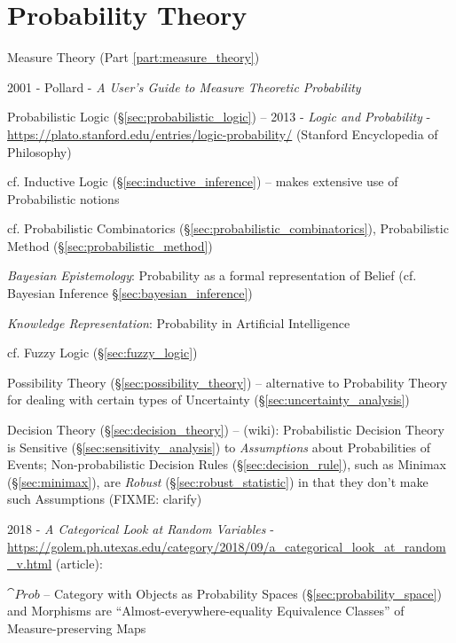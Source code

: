 \part{Probability Theory}\label{part:probability_theory}

\fist Measure Theory (Part \ref{part:measure_theory})

2001 - Pollard - \emph{A User's Guide to Measure Theoretic Probability}

\fist Probabilistic Logic (\S\ref{sec:probabilistic_logic}) --
2013 - \emph{Logic and Probability} -
\url{https://plato.stanford.edu/entries/logic-probability/} (Stanford
Encyclopedia of Philosophy)

\fist cf. Inductive Logic (\S\ref{sec:inductive_inference}) -- makes extensive
use of Probabilistic notions

cf. Probabilistic Combinatorics (\S\ref{sec:probabilistic_combinatorics}),
Probabilistic Method (\S\ref{sec:probabilistic_method})

\emph{Bayesian Epistemology}: Probability as a formal representation of Belief
(cf. Bayesian Inference \S\ref{sec:bayesian_inference})

\emph{Knowledge Representation}: Probability in Artificial Intelligence

\fist cf. Fuzzy Logic (\S\ref{sec:fuzzy_logic})

\fist Possibility Theory (\S\ref{sec:possibility_theory}) -- alternative to
Probability Theory for dealing with certain types of Uncertainty
(\S\ref{sec:uncertainty_analysis})

\fist Decision Theory (\S\ref{sec:decision_theory}) --
(wiki): Probabilistic Decision Theory is Sensitive
(\S\ref{sec:sensitivity_analysis}) to \emph{Assumptions} about Probabilities of
Events; Non-probabilistic Decision Rules (\S\ref{sec:decision_rule}), such as
Minimax (\S\ref{sec:minimax}), are \emph{Robust} (\S\ref{sec:robust_statistic})
in that they don't make such Assumptions (FIXME: clarify)

2018 - \emph{A Categorical Look at Random Variables} -
\url{https://golem.ph.utexas.edu/category/2018/09/a_categorical_look_at_random_v.html}
(article):

$\cat{Prob}$ -- Category with Objects as Probability Spaces
(\S\ref{sec:probability_space}) and Morphisms are ``Almost-everywhere-equality
Equivalence Classes'' of Measure-preserving Maps

